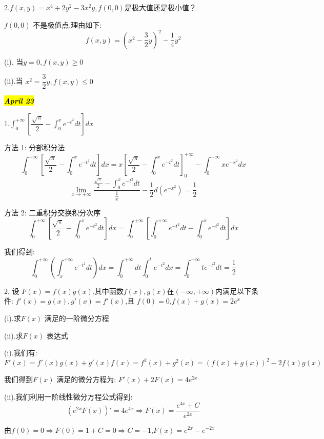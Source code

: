 2.$f(x,y)=x^4+2y^2-3x^2y,f(0,0)\text{是极大值还是极小值？}$
\begin{solution}
	
	$f(0,0)$ 不是极值点,理由如下: 
	$$f(x,y)=(x^2-\frac{3}{2}y)^2-\frac{1}{4}y^2$$
	
	(i). 当$y=0,f(x,y)\geq 0$
	
	(ii).当 $x^2=\dfrac{3}{2}y,f(x,y)\leq 0$
\end{solution}

\hl{\textbf{\textit{April 23}}}

1.$\int_{0}^{+\infty}\left[ \dfrac{\sqrt{\pi}}{2}-\int_{0}^{x}e^{-t^2}dt\right]dx$
\begin{solution}
	
	方法 1:  分部积分法
	$$\int_{0}^{+\infty}\left[ \frac{\sqrt{\pi}}{2}-\int_{0}^{x}e^{-t^2}dt\right]dx=x\left[ \frac{\sqrt{\pi}}{2}-\int_{0}^{x}e^{-t^2}dt\right]_{0}^{+\infty}-\int_{0}^{+\infty}xe^{-x^2}dx$$
	$$\lim\limits_{x\rightarrow +\infty}\frac{\frac{\sqrt{\pi}}{2}-\int_{0}^{x}e^{-t^2}dt}{\frac{1}{x}}-\frac{1}{2}d(e^{-x^2})=\frac{1}{2}$$
	
	
	方法 2:  二重积分交换积分次序
	$$\int_{0}^{+\infty}\left[ \frac{\sqrt{\pi}}{2}-\int_{0}^{x}e^{-t^2}dt\right]dx=\int_{0}^{+\infty}\left[\int_{0}^{+\infty}e^{-t^2}dt-\int_{0}^{x}e^{-t^2}dt\right]dx$$
	
	我们得到: 
	$$\int_{0}^{+\infty}(\int_{x}^{+\infty}e^{-t^2}dt)dx=\int_{0}^{+\infty}dt\int_{0}^{t}e^{-t^2}dx=\int_{0}^{+\infty}te^{-t^2}dt=\frac{1}{2}$$
\end{solution}

2. 设 $F(x)=f(x)g(x)$,其中函数$f(x),g(x)$在$(-\infty,+\infty)$内满足以下条件: $f'(x)=g(x),g'(x)=f'(x)$,且 $f(0)=0$,$f(x)+g(x)=2e^x$

(i).求$F(x)$ 满足的一阶微分方程

(ii).求$F(x)$ 表达式
\begin{solution}
	
	(i).我们有: 
	$$F'(x)=f'(x)g(x)+g'(x)f(x)=f^2(x)+g^2(x)=(f(x)+g(x))^2-2f(x)g(x)$$
	
	我们得到$F(x)$ 满足的微分方程为: $F'(x)+2F(x)=4e^{2x}$
	
	(ii).我们利用一阶线性微分方程公式得到: 
	$$(e^{2x}F(x))'=4e^{4x}\Rightarrow F(x)=\frac{e^{4x}+C}{e^{2x}}$$
	
	由$f(0)=0\Rightarrow F(0)=1+C=0\Rightarrow C=-1$,$F(x)=e^{2x}-e^{-2x}$
\end{solution}


